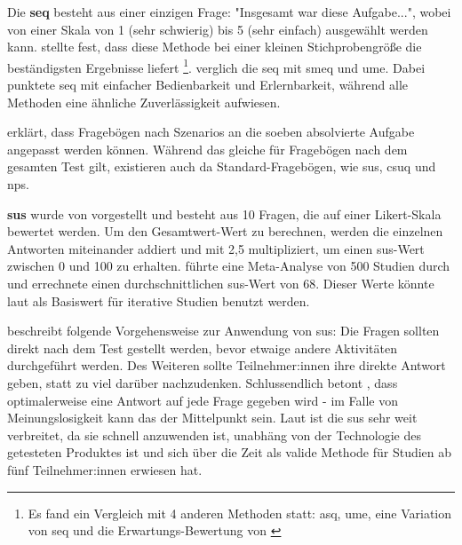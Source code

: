 Die \textbf{\ac{seq}} besteht aus einer einzigen Frage: "Insgesamt war diese Aufgabe...",
wobei von einer Skala von 1 (sehr schwierig) bis 5 (sehr einfach) ausgewählt werden kann.
\textcite{tedescoComparisonMethods2006} stellte fest, dass diese Methode bei einer kleinen
Stichprobengröße die beständigsten Ergebnisse liefert \footnote{Es fand ein Vergleich mit 4 anderen
  Methoden statt: \ac{asq}, \ac{ume}, eine Variation von \ac{seq} und die Erwartungs-Bewertung von
  \textcite{albertThisWhat2003}}. \textcite{sauroComparisonThree2009} verglich die \ac{seq} mit
\ac{smeq} und \ac{ume}. Dabei punktete \ac{seq} mit einfacher Bedienbarkeit und Erlernbarkeit,
während alle Methoden eine ähnliche Zuverlässigkeit aufwiesen.

\textcite{barnumUsabilityTesting2021} erklärt, dass Fragebögen nach Szenarios an die soeben
absolvierte Aufgabe angepasst werden können. Während das gleiche für Fragebögen nach dem gesamten
Test gilt, existieren auch da Standard-Fragebögen, wie \ac{sus}, \ac{csuq} und \ac{nps}.

\textbf{\ac{sus}} wurde von \textcite{brookeSUSQuick1996}  vorgestellt und besteht aus 10 Fragen, die auf einer Likert-Skala bewertet werden.
 Um den Gesamtwert-Wert zu berechnen, werden die einzelnen
Antworten miteinander addiert und mit 2,5 multipliziert, um einen \ac{sus}-Wert zwischen 0 und 100
zu erhalten. \textcite{sauroMeasuringUsability2011} führte eine Meta-Analyse von 500 Studien durch
und errechnete einen durchschnittlichen \ac{sus}-Wert von 68. Dieser Werte könnte laut
\textcite{barnumUsabilityTesting2021} als Basiswert für iterative Studien benutzt werden.

\textcite{brookeSUSQuick1996} beschreibt folgende Vorgehensweise zur Anwendung von \ac{sus}: Die
Fragen sollten direkt nach dem Test gestellt werden, bevor etwaige andere Aktivitäten durchgeführt
werden. Des Weiteren sollte Teilnehmer:innen ihre direkte Antwort geben, statt zu viel darüber
nachzudenken. Schlussendlich betont \textcite{brookeSUSQuick1996}, dass optimalerweise eine Antwort
auf jede Frage gegeben wird - im Falle von Meinungslosigkeit kann das der Mittelpunkt sein. Laut
\textcite{barnumUsabilityTesting2021} ist die \ac{sus} sehr weit verbreitet, da sie schnell
anzuwenden ist, unabhäng von der Technologie des getesteten Produktes ist und sich über die Zeit als
valide Methode für Studien ab fünf Teilnehmer:innen erwiesen hat.

